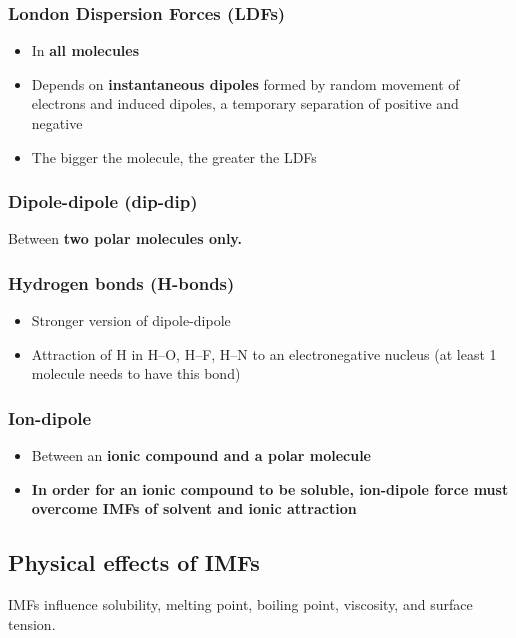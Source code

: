 \documentclass[a4paper, 12pt]{article}
\begin{document}
\subsubsection*{London Dispersion Forces (LDFs)}

\begin{itemize}
\item In \textbf{all molecules}
\item Depends on \textbf{instantaneous dipoles} formed by random movement of electrons and induced dipoles, a temporary separation of positive and negative
\item The bigger the molecule, the greater the LDFs
\end{itemize}

\subsubsection*{Dipole-dipole (dip-dip)}
Between \textbf{two polar molecules only.}

\subsubsection*{Hydrogen bonds (H-bonds)}
\begin{itemize}
\item Stronger version of dipole-dipole
\item Attraction of H in H--O, H--F, H--N to an electronegative nucleus (at least 1 molecule needs to have this bond)
\end{itemize}

\subsubsection*{Ion-dipole}
\begin{itemize}
\item Between an \textbf{ionic compound and a polar molecule}
\item \textbf{In order for an ionic compound to be soluble, ion-dipole force must overcome IMFs of solvent and ionic attraction}
\end{itemize}

\subsection*{Physical effects of IMFs}

IMFs influence solubility, melting point, boiling point, viscosity, and surface tension.
\end{document}
